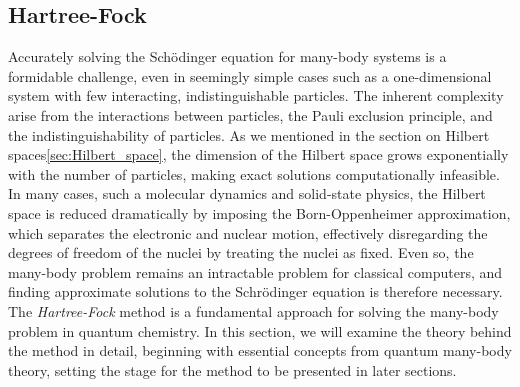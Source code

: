 \documentclass{subfiles}
\begin{document}
\subsection*{Hartree-Fock}\label{sec:HF_theory}
Accurately solving the Schödinger equation for many-body systems is a formidable challenge, even in seemingly simple cases such as a one-dimensional system with few interacting, indistinguishable particles. The inherent complexity arise from the interactions between particles, the Pauli exclusion principle, and the indistinguishability of particles. As we mentioned in the section on Hilbert spaces\ref{sec:Hilbert_space}, the dimension of the Hilbert space grows exponentially with the number of particles, making exact solutions computationally infeasible. In many cases, such a molecular dynamics and solid-state physics, the Hilbert space is reduced dramatically by imposing the Born-Oppenheimer approximation, which separates the electronic and nuclear motion, effectively disregarding the degrees of freedom of the nuclei by treating the nuclei as fixed. Even so, the many-body problem remains an intractable problem for classical computers, and finding approximate solutions to the Schrödinger equation is therefore necessary. The \emph{Hartree-Fock} method is a fundamental approach for solving the many-body problem in quantum chemistry. In this section, we will examine the theory behind the method in detail, beginning with essential concepts from quantum many-body theory, setting the stage for the method to be presented in later sections. \\ \\
\end{document}
